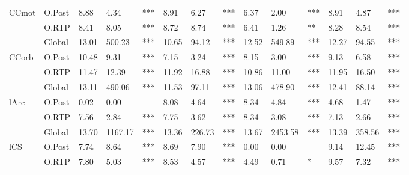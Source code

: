 \begin{tabular}{lllll|lll|lll|lll}
CCmot & \multicolumn{1}{l|}{\cellcolor[HTML]{C0C0C0}O.Post} & \cellcolor[HTML]{C0C0C0}8.88 & \cellcolor[HTML]{C0C0C0}4.34 & \cellcolor[HTML]{C0C0C0}*** & \cellcolor[HTML]{C0C0C0}8.91 & \cellcolor[HTML]{C0C0C0}6.27 & \cellcolor[HTML]{C0C0C0}*** & \cellcolor[HTML]{C0C0C0}6.37 & \cellcolor[HTML]{C0C0C0}2.00 & \cellcolor[HTML]{C0C0C0}*** & \cellcolor[HTML]{C0C0C0}8.91 & \cellcolor[HTML]{C0C0C0}4.87 & \cellcolor[HTML]{C0C0C0}*** \\
 & \multicolumn{1}{l|}{O.RTP} & 8.41 & 8.05 & *** & 8.72 & 8.74 & *** & 6.41 & 1.26 & ** & 8.28 & 8.54 & *** \\
\rowcolor[HTML]{EFEFEF}
 & \multicolumn{1}{l|}{\cellcolor[HTML]{EFEFEF}Global} & 13.01 & 500.23 & *** & 10.65 & 94.12 & *** & 12.52 & 549.89 & *** & 12.27 & 94.55 & *** \\
\rowcolor[HTML]{C0C0C0}
\cellcolor[HTML]{EFEFEF}CCorb & \multicolumn{1}{l|}{\cellcolor[HTML]{C0C0C0}O.Post} & 10.48 & 9.31 & *** & 7.15 & 3.24 & *** & 8.15 & 3.00 & *** & 9.13 & 6.58 & *** \\
\rowcolor[HTML]{EFEFEF}
 & \multicolumn{1}{l|}{\cellcolor[HTML]{EFEFEF}O.RTP} & 11.47 & 12.39 & *** & 11.92 & 16.88 & *** & 10.86 & 11.00 & *** & 11.95 & 16.50 & *** \\
 & \multicolumn{1}{l|}{Global} & 13.11 & 490.06 & *** & 11.53 & 97.11 & *** & 13.06 & 478.90 & *** & 12.41 & 88.14 & *** \\
lArc & \multicolumn{1}{l|}{\cellcolor[HTML]{C0C0C0}O.Post} & \cellcolor[HTML]{C0C0C0}0.02 & \cellcolor[HTML]{C0C0C0}0.00 & \cellcolor[HTML]{C0C0C0} & \cellcolor[HTML]{C0C0C0}8.08 & \cellcolor[HTML]{C0C0C0}4.64 & \cellcolor[HTML]{C0C0C0}*** & \cellcolor[HTML]{C0C0C0}8.34 & \cellcolor[HTML]{C0C0C0}4.84 & \cellcolor[HTML]{C0C0C0}*** & \cellcolor[HTML]{C0C0C0}4.68 & \cellcolor[HTML]{C0C0C0}1.47 & \cellcolor[HTML]{C0C0C0}*** \\
 & \multicolumn{1}{l|}{O.RTP} & 7.56 & 2.84 & *** & 7.75 & 3.62 & *** & 8.34 & 3.08 & *** & 7.13 & 2.66 & *** \\
\rowcolor[HTML]{EFEFEF}
 & \multicolumn{1}{l|}{\cellcolor[HTML]{EFEFEF}Global} & 13.70 & 1167.17 & *** & 13.36 & 226.73 & *** & 13.67 & 2453.58 & *** & 13.39 & 358.56 & *** \\
\rowcolor[HTML]{C0C0C0}
\cellcolor[HTML]{EFEFEF}lCS & \multicolumn{1}{l|}{\cellcolor[HTML]{C0C0C0}O.Post} & 7.74 & 8.64 & *** & 8.69 & 7.90 & *** & 0.00 & 0.00 &  & 9.14 & 12.45 & *** \\
\rowcolor[HTML]{EFEFEF}
 & \multicolumn{1}{l|}{\cellcolor[HTML]{EFEFEF}O.RTP} & 7.80 & 5.03 & *** & 8.53 & 4.57 & *** & 4.49 & 0.71 & * & 9.57 & 7.32 & *** \\

\end{tabular}
